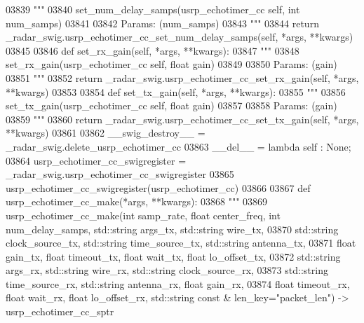 \begin{DoxyCode}
{{{{{{{{{{{{{{03839         \textcolor{stringliteral}{"""}
03840 \textcolor{stringliteral}{        set\_num\_delay\_samps(usrp\_echotimer\_cc self, int num\_samps)}
03841 \textcolor{stringliteral}{}
03842 \textcolor{stringliteral}{        Params: (num\_samps)}
03843 \textcolor{stringliteral}{        """}
03844         \textcolor{keywordflow}{return} \_radar\_swig.usrp\_echotimer\_cc\_set\_num\_delay\_samps(self, *args, **kwargs)
03845 
03846     \textcolor{keyword}{def }set_rx_gain(self, *args, **kwargs):
03847         \textcolor{stringliteral}{"""}
03848 \textcolor{stringliteral}{        set\_rx\_gain(usrp\_echotimer\_cc self, float gain)}
03849 \textcolor{stringliteral}{}
03850 \textcolor{stringliteral}{        Params: (gain)}
03851 \textcolor{stringliteral}{        """}
03852         \textcolor{keywordflow}{return} \_radar\_swig.usrp\_echotimer\_cc\_set\_rx\_gain(self, *args, **kwargs)
03853 
03854     \textcolor{keyword}{def }set_tx_gain(self, *args, **kwargs):
03855         \textcolor{stringliteral}{"""}
03856 \textcolor{stringliteral}{        set\_tx\_gain(usrp\_echotimer\_cc self, float gain)}
03857 \textcolor{stringliteral}{}
03858 \textcolor{stringliteral}{        Params: (gain)}
03859 \textcolor{stringliteral}{        """}
03860         \textcolor{keywordflow}{return} \_radar\_swig.usrp\_echotimer\_cc\_set\_tx\_gain(self, *args, **kwargs)
03861 
03862     \_\_swig\_destroy\_\_ = \_radar\_swig.delete\_usrp\_echotimer\_cc
03863     \_\_del\_\_ = \textcolor{keyword}{lambda} self : \textcolor{keywordtype}{None};
03864 usrp\_echotimer\_cc\_swigregister = \_radar\_swig.usrp\_echotimer\_cc\_swigregister
03865 usrp_echotimer_cc_swigregister(usrp\_echotimer\_cc)
03866 
03867 \textcolor{keyword}{def }usrp_echotimer_cc_make(*args, **kwargs):
03868   \textcolor{stringliteral}{"""}
03869 \textcolor{stringliteral}{    usrp\_echotimer\_cc\_make(int samp\_rate, float center\_freq, int num\_delay\_samps, std::string args\_tx,
       std::string wire\_tx, }
03870 \textcolor{stringliteral}{        std::string clock\_source\_tx, std::string time\_source\_tx, std::string antenna\_tx, }
03871 \textcolor{stringliteral}{        float gain\_tx, float timeout\_tx, float wait\_tx, float lo\_offset\_tx, }
03872 \textcolor{stringliteral}{        std::string args\_rx, std::string wire\_rx, std::string clock\_source\_rx, }
03873 \textcolor{stringliteral}{        std::string time\_source\_rx, std::string antenna\_rx, float gain\_rx, }
03874 \textcolor{stringliteral}{        float timeout\_rx, float wait\_rx, float lo\_offset\_rx, std::string const & len\_key="packet\_len") ->
       usrp\_echotimer\_cc\_sptr}
}}}}}}}}}}}}}}
\end{DoxyCode}
